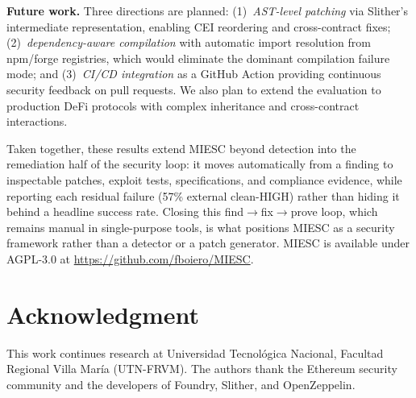 \documentclass[conference]{IEEEtran}
\begin{document}
\textbf{Future work.} Three directions are planned: (1)~\emph{AST-level patching} via Slither's intermediate representation, enabling CEI reordering and cross-contract fixes; (2)~\emph{dependency-aware compilation} with automatic import resolution from npm/forge registries, which would eliminate the dominant compilation failure mode; and (3)~\emph{CI/CD integration} as a GitHub Action providing continuous security feedback on pull requests. We also plan to extend the evaluation to production DeFi protocols with complex inheritance and cross-contract interactions.

Taken together, these results extend MIESC beyond detection into the remediation half of the security loop: it moves automatically from a finding to inspectable patches, exploit tests, specifications, and compliance evidence, while reporting each residual failure (57\% external clean-HIGH) rather than hiding it behind a headline success rate. Closing this find$\rightarrow$fix$\rightarrow$prove loop, which remains manual in single-purpose tools, is what positions MIESC as a security framework rather than a detector or a patch generator. MIESC is available under AGPL-3.0 at \url{https://github.com/fboiero/MIESC}.

\section*{Acknowledgment}

This work continues research at Universidad Tecnol\'ogica Nacional, Facultad Regional Villa Mar\'ia (UTN-FRVM). The authors thank the Ethereum security community and the developers of Foundry, Slither, and OpenZeppelin.



\end{document}
